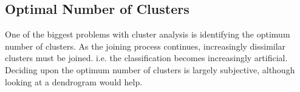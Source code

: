 \subsection{Optimal Number of Clusters}
One of the biggest problems with cluster analysis is identifying the optimum number of
clusters. As the joining process continues, increasingly dissimilar clusters must be joined. i.e. the classification becomes increasingly artificial. Deciding upon the optimum number
of clusters is largely subjective, although looking at a dendrogram would help.
